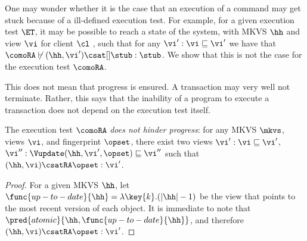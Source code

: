 One may wonder whether it is the case that an execution of a command may get stuck because of a ill-defined execution test.
For example, for a given execution test $\ET$, it may be possible to reach a state of the system, with MKVS $\hh$ and view $\vi$ for client $\cl$ , such that for any $\vi': \vi \sqsubseteq \vi'$ we have that $ \comoRA \not\vdash (\hh, \vi') \csat[] \stub : \stub $.
We show that this is not the case for the execution test $\comoRA$. 

\ac{This does not mean that progress is ensured. A transaction may very well 
not terminate. Rather, this says that the inability of a program to execute a 
transaction does not depend on the execution test itself.}
\begin{proposition}
\label{prop:ra.progress}
The execution test $\comoRA$ \emph{does not hinder progress}: for any MKVS $\mkvs$, views $\vi$, and fingerprint $\opset$, there exist two views $\vi': \vi \sqsubseteq \vi'$, $\vi'': \Vupdate(\hh, \vi', \opset) \sqsubseteq \vi''$ such that $(\hh, \vi) \csatRA \opset : \vi'$.
\end{proposition}

\begin{proof}
For a given MKVS $\hh$, let $\func{up-to-date}{\hh} = \lambda \key{k}. (\lvert \hh \rvert - 1)$ be the view that points to the most recent version of each object. It is immediate to note that $\pred{atomic}{\hh, \func{up-to-date}{\hh}}$, and therefore $(\hh, \vi) \csatRA \opset : \vi'$. 
\end{proof}
